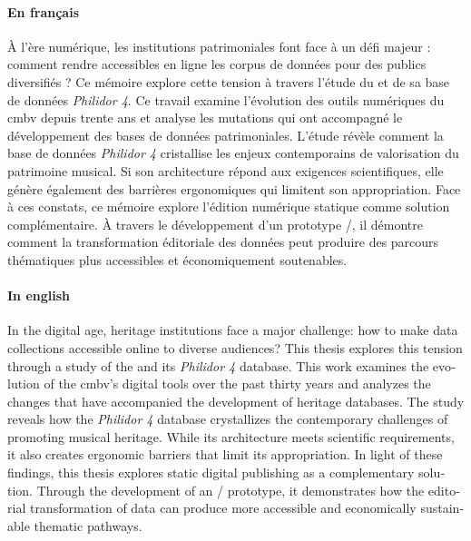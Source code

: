 \documentclass[12pt,twoside]{book}
\begin{document}
	\paragraph{En français} À l'ère numérique, les institutions patrimoniales font face à un défi majeur : comment rendre accessibles en ligne les corpus de données pour des publics diversifiés ? Ce mémoire explore cette tension à travers l'étude du  et de sa base de données \textit{Philidor 4}. Ce travail examine l'évolution des outils numériques du \gls{cmbv} depuis trente ans et analyse les mutations qui ont accompagné le développement des bases de données patrimoniales. L'étude révèle comment la base de données \textit{Philidor 4} cristallise les enjeux contemporains de valorisation du patrimoine musical. Si son architecture répond aux exigences scientifiques, elle génère également des barrières ergonomiques qui limitent son appropriation. Face à ces constats, ce mémoire explore l'édition numérique statique comme solution complémentaire. À travers le développement d'un prototype /, il démontre comment la transformation éditoriale des données peut produire des parcours thématiques plus accessibles et économiquement soutenables.
	
	\medskip
	
	\begin{english}
		\paragraph{In english} In the digital age, heritage institutions face a major challenge: how to make data collections accessible online to diverse audiences? This thesis explores this tension through a study of the  and its \textit{Philidor 4} database. This work examines the evolution of the \gls{cmbv}'s digital tools over the past thirty years and analyzes the changes that have accompanied the development of heritage databases. The study reveals how the \textit{Philidor 4} database crystallizes the contemporary challenges of promoting musical heritage. While its architecture meets scientific requirements, it also creates ergonomic barriers that limit
		its appropriation. In light of these findings, this thesis explores static digital publishing as a complementary solution. Through the development of an / prototype, it demonstrates how the editorial transformation of data can produce more accessible and economically sustainable thematic pathways.
	\end{english}
	
\end{document}
